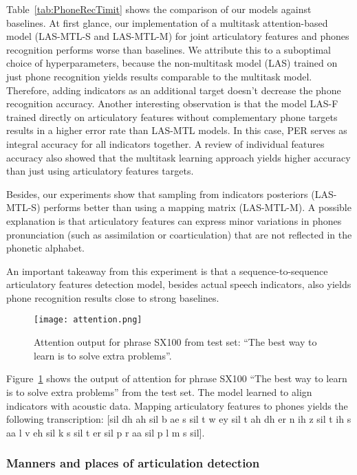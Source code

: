 \documentclass[a4paper]{article}
\begin{document}
Table~\ref{tab:PhoneRecTimit} shows the comparison of our models against baselines. At first glance, our implementation of a multitask attention-based model (LAS-MTL-S and LAS-MTL-M) for joint articulatory features and phones recognition performs worse than baselines. We attribute this to a suboptimal choice of hyperparameters, because the non-multitask model (LAS) trained on just phone recognition yields results comparable to the multitask model. Therefore, adding indicators as an additional target doesn't decrease the phone recognition accuracy. Another interesting observation is that the model LAS-F trained directly on articulatory features without complementary phone targets results in a higher error rate than LAS-MTL models. In this case, PER serves as integral accuracy for all indicators together. A review of individual features accuracy also showed that the multitask learning approach yields higher accuracy than just using articulatory features targets.

Besides, our experiments show that sampling from indicators posteriors (LAS-MTL-S) performs better than using a mapping matrix (LAS-MTL-M). A possible explanation is that articulatory features can express minor variations in phones pronunciation (such as assimilation or coarticulation) that are not reflected in the phonetic alphabet.

An important takeaway from this experiment is that a sequence-to-sequence articulatory features detection model, besides actual speech indicators, also yields phone recognition results close to strong baselines.

\begin{figure}[ht]
  \centering
  \texttt{[image: attention.png]}
  \caption{Attention output for phrase SX100 from test set: ``The best way to learn is to solve extra problems''.}
  \label{fig:alignment}
\end{figure}

Figure~\ref{fig:alignment} shows the output of attention for phrase SX100 ``The best way to learn is to solve extra problems'' from the test set. The model learned to align indicators with acoustic data. Mapping articulatory features to phones yields the following transcription: [sil dh ah sil b ae s sil t w ey sil t ah dh er n ih z sil t ih s aa l v eh sil k s sil t er sil p r aa sil p l m s sil].

\subsubsection{Manners and places of articulation detection}
\end{document}
